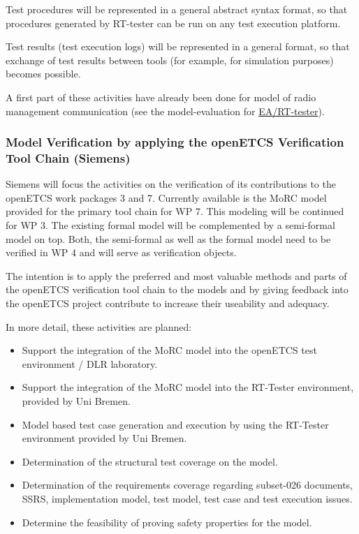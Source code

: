 \documentclass{template/openetcs_report}
\begin{document}
Test procedures will be represented in a general abstract syntax
format, so that procedures generated by RT-tester can be run on any
test execution platform.

Test results (test execution logs) will be represented in a general
format, so that exchange of test results between tools (for example,
for simulation purposes) becomes possible.



A first part of these activities have already been done for model of
radio management communication (see the model-evaluation for
\href{https://github.com/openETCS/model-evaluation/blob/master/model/EA-SysML/new_version/doc/ea_sysml_report.pdf}{EA/RT-tester}). 

\subsubsection{Model Verification by applying the openETCS Verification Tool Chain (Siemens)}

Siemens will focus the activities on the verification of its contributions to the openETCS work packages 3 and 7. Currently available is the MoRC model provided for the primary tool chain for WP 7. This modeling will be continued for WP 3. The existing formal model will be complemented by a semi-formal model on top. Both, the semi-formal as well as the formal model need to be verified in WP 4 and will serve as verification objects. 

The intention is to apply the preferred and most valuable methods and parts of the openETCS verification tool chain to the models and by giving feedback into the openETCS project contribute to increase their useability and adequacy.  

In more detail, these activities are planned: 

\begin{itemize}
	\item Support the integration of the MoRC model into the openETCS test environment / DLR laboratory.
	\item Support the integration of the MoRC model into the RT-Tester environment, provided by Uni Bremen. 
	\item Model based test case generation and execution by using the RT-Tester environment provided by Uni Bremen. 
	\item Determination of the structural test coverage on the model.
	\item Determination of the requirements coverage regarding subset-026 documents, SSRS, implementation model, test model, test case and test execution issues.
	\item Determine the feasibility of proving safety properties for the model.
\end{itemize}
\end{document}
